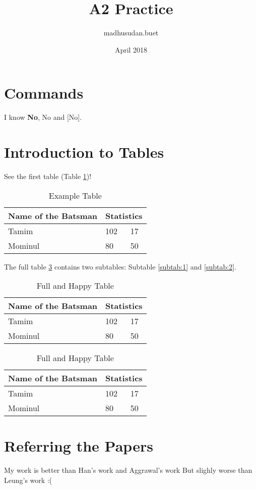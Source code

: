 \documentclass{article}
\title{A2 Practice}
\author{madhusudan.buet }
\date{April 2018}
\newcommand{\everything}[3][NO]{\textbf{#1}, #2 and #3}
\begin{document}
\maketitle
\listoftables
\section{Commands}
I know \everything[No]{No}[No].
\section{Introduction to Tables}
See the first table (Table \ref{tab:1})!
\begin{table}[h!]
    \centering
    \begin{tabular}{|| p{2cm} | p{3cm} | p{2cm} ||}
        \hline
        Name of the Batsman & \multicolumn{2}{c||}{Statistics} \\
        \hline
        \hline
        Tamim & 102 & 17\\
        \hline
        Mominul & 80 & 50\\
        \hline
    \end{tabular}
    \caption{Example Table}
    \label{tab:1}
\end{table}

The full table \ref{tab:2} contains two subtables: Subtable \ref{subtab:1} and \ref{subtab:2}.

\begin{table}
    \begin{subtable}{0.7\textwidth}
        \begin{tabular}{|| p{2cm} | p{3cm} | p{2cm} ||}
            \hline
            Name of the Batsman & \multicolumn{2}{c||}{Statistics} \\
            \hline
            \hline
            Tamim & 102 & 17\\
            \hline
            Mominul & 80 & 50\\
            \hline
        \end{tabular}
        \caption{First Table}
        \label{subtab:1}
    \end{subtable}
    \begin{subtable}{0.7\textwidth}
        \begin{tabular}{|| p{2cm} | p{3cm} | p{2cm} ||}
            \hline
            Name of the Batsman & \multicolumn{2}{c||}{Statistics} \\
            \hline
            \hline
            Tamim & 102 & 17\\
            \hline
            Mominul & 80 & 50\\
            \hline
        \end{tabular}
        \caption{Second Table}
        \label{subtab:2}
    \end{subtable}
    \caption{Full and Happy Table}
    \label{tab:2}
\end{table}

\section{Referring the Papers}

My work is better than Han's work\cite{Han:2000} and Aggrawal's work\cite{Aggarwal:2009} But slighly worse than Leung's work \cite{Leung:2008} :(

\printbibliography[title={Hello World}]
%
%
\end{document}
